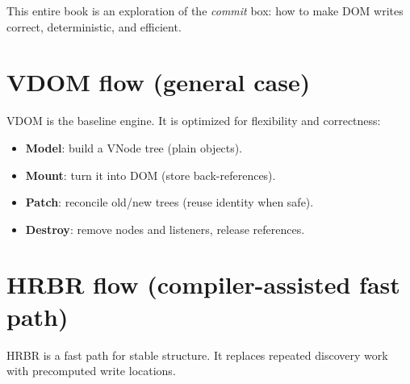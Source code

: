 \begin{center}
\end{center}

This entire book is an exploration of the \emph{commit} box: how to make DOM writes correct, deterministic, and efficient.

\section{VDOM flow (general case)}

VDOM is the baseline engine.
It is optimized for flexibility and correctness:

\begin{itemize}
  \item \textbf{Model}: build a VNode tree (plain objects).
  \item \textbf{Mount}: turn it into DOM (store back-references).
  \item \textbf{Patch}: reconcile old/new trees (reuse identity when safe).
  \item \textbf{Destroy}: remove nodes and listeners, release references.
\end{itemize}

\section{HRBR flow (compiler-assisted fast path)}

HRBR is a fast path for stable structure.
It replaces repeated discovery work with precomputed write locations.

